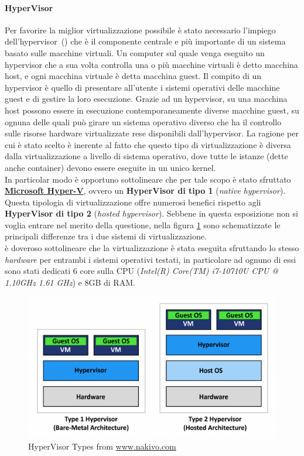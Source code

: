 \paragraph{HyperVisor} Per favorire la miglior virtualizzazione possibile è stato necessario l'impiego dell'hypervisor~(\cite{itwiki:120906467}) che è il componente centrale e più importante di un sistema basato sulle macchine virtuali. Un computer sul quale venga eseguito un hypervisor che a sua volta controlla una o più macchine virtuali è detto macchina host, e ogni macchina virtuale è detta macchina guest. Il compito di un hypervisor è quello di presentare all'utente i sistemi operativi delle macchine guest e di gestire la loro esecuzione. Grazie ad un hypervisor, su una macchina host possono essere in esecuzione contemporaneamente diverse macchine guest, su ognuna delle quali può girare un sistema operativo diverso che ha il controllo sulle risorse hardware virtualizzate rese disponibili dall'hypervisor. La ragione per cui è stato scelto è inerente al fatto che questo tipo di virtualizzazione è diversa dalla virtualizzazione a livello di sistema operativo, dove tutte le istanze (dette anche container) devono essere eseguite in un unico kernel. \\
In particolar modo è opportuno sottolineare che per tale scopo è stato sfruttato \textbf{\href{https://docs.microsoft.com/it-it/virtualization/hyper-v-on-windows/about/}{Microsoft Hyper-V}}, ovvero un \textbf{HyperVisor di tipo 1} (\textit{native hypervisor}). Questa tipologia di virtualizzazione offre numerosi benefici rispetto agli \textbf{HyperVisor di tipo 2} (\textit{hosted hypervisor}). Sebbene in questa esposizione non si voglia entrare nel merito della questione, nella figura \ref{fig:HyperVisor} sono schematizzate le principali differenze tra i due sistemi di virtualizzazione. \\
è doveroso sottolineare che la virtualizzazione è stata eseguita sfruttando lo stesso \textit{hardware} per entrambi i sistemi operativi testati, in particolare ad ognuno di essi sono stati dedicati 6 core sulla CPU (\textit{Intel(R) Core(TM) i7-10710U CPU @ 1.10GHz 1.61 GHz}) e 8GB di RAM.
\begin{figure}[h!]
    \centering
    \includegraphics[width=1\textwidth]{figs/Type-1-and-type-2-hypervisor-1024x584.png}
    \caption{HyperVisor Types from \href{https://www.nakivo.com/blog/it/hyper-v-virtualbox-one-choose-infrastructure-2/}{www.nakivo.com}}
    \label{fig:HyperVisor}
\end{figure}

